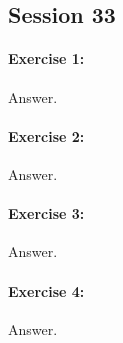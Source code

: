 \documentclass{article}
\begin{document}
\subsection*{Session 33}
\paragraph{Exercise 1:}
Answer.
\paragraph{Exercise 2:}
Answer.
\paragraph{Exercise 3:}
Answer.
\paragraph{Exercise 4:}
Answer.
\newpage
\end{document}
